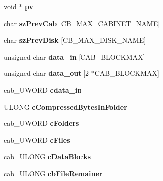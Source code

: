 \begin{DoxyCompactItemize}
\hyperlink{interfacevoid}{void} $\ast$ {\bfseries pv}
\item 
\mbox{\label{struct_f_c_i___int_af52c35f221b39e712d03a77e67b95fcb}} 
char {\bfseries sz\+Prev\+Cab} \mbox{[}C\+B\+\_\+\+M\+A\+X\+\_\+\+C\+A\+B\+I\+N\+E\+T\+\_\+\+N\+A\+ME\mbox{]}
\item 
\mbox{\label{struct_f_c_i___int_a03df6f4ce272b14ed0c3d7e4736dcdfe}} 
char {\bfseries sz\+Prev\+Disk} \mbox{[}C\+B\+\_\+\+M\+A\+X\+\_\+\+D\+I\+S\+K\+\_\+\+N\+A\+ME\mbox{]}
\item 
\mbox{\label{struct_f_c_i___int_a9b75437b03f49589ed0ea1b7d662c900}} 
unsigned char {\bfseries data\+\_\+in} \mbox{[}C\+A\+B\+\_\+\+B\+L\+O\+C\+K\+M\+AX\mbox{]}
\item 
\mbox{\label{struct_f_c_i___int_a3c30e0889f58d373a80e92b04d8d1000}} 
unsigned char {\bfseries data\+\_\+out} \mbox{[}2 $\ast$C\+A\+B\+\_\+\+B\+L\+O\+C\+K\+M\+AX\mbox{]}
\item 
\mbox{\label{struct_f_c_i___int_a5a2f9dc172c75bee40870392262b23f9}} 
cab\+\_\+\+U\+W\+O\+RD {\bfseries cdata\+\_\+in}
\item 
\mbox{\label{struct_f_c_i___int_ad3db0056a0403e55e6d7dec58bec622f}} 
U\+L\+O\+NG {\bfseries c\+Compressed\+Bytes\+In\+Folder}
\item 
\mbox{\label{struct_f_c_i___int_abf7e36c4c142e13cca065214be7668ce}} 
cab\+\_\+\+U\+W\+O\+RD {\bfseries c\+Folders}
\item 
\mbox{\label{struct_f_c_i___int_a1922916d08097ee058dbe4878a13ac32}} 
cab\+\_\+\+U\+W\+O\+RD {\bfseries c\+Files}
\item 
\mbox{\label{struct_f_c_i___int_ae94c4ebb7ca01437e7b70f8595c4bc0d}} 
cab\+\_\+\+U\+L\+O\+NG {\bfseries c\+Data\+Blocks}
\item 
\mbox{\label{struct_f_c_i___int_af36baa32567d9cb2623dc2bf39c23e7c}} 
cab\+\_\+\+U\+L\+O\+NG {\bfseries cb\+File\+Remainer}
\item 

\end{DoxyCompactItemize}
